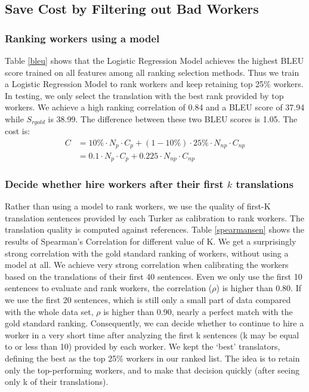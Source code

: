 \documentclass[11pt]{article}
\begin{document}
 \subsection{Save Cost by Filtering out Bad Workers}
 \subsubsection{Ranking workers using a model}
Table \ref{bleu} shows that the Logistic Regression Model achieves the highest BLEU score trained on all features among all ranking selection methods. Thus we train a Logistic Regression Model to rank workers and keep retaining top 25\% workers. 
In testing, we only select the translation with the best rank provided by top workers. We achieve a high ranking correlation of 0.84 and a BLEU score of 37.94 while $S_{rgold}$ is 38.99. The difference between these two BLEU scores is 1.05. The cost is:
 \begin{align*}
  C& = 10\% \cdot N_{p}\cdot C_{p}  + (1-10\% )\cdot 25\% \cdot N_{np} \cdot C_{np}\\
   & = 0.1 \cdot N_{p}\cdot C_{p}  + 0.225\cdot N_{np} \cdot C_{np}
  \end{align*}
 \subsubsection{Decide whether hire workers after their first $k$ translations}
Rather than using a model to rank workers, we use the quality of first-K translation sentences provided by each Turker as calibration to rank workers. The translation quality is computed against references. Table \ref{spearmansen} shows the results of Spearman's Correlation for different value of K.  We get a surprisingly strong correlation with the gold standard ranking of workers, without using a model at all. 
We achieve  very strong correlation when calibrating the workers based on  the translations of their first 40 sentences. Even we only use the first 10 sentences to evaluate and rank workers, the correlation ($\rho$) is higher than 0.80. If we use the first 20 sentences, which is still only a small  part of data compared with the whole data set, $\rho$ is higher than 0.90, nearly a perfect match with the gold standard ranking. Consequently, we can decide whether to continue to hire a worker in a very short time after analyzing the first k sentences (k may be equal to or less than 10) provided by each worker. 
We kept the `best' translators, defining the best as the top 25\% workers in our ranked list.  The idea is to retain only the top-performing workers, and to make that decision quickly (after seeing only k of their translations).  
\end{document}
